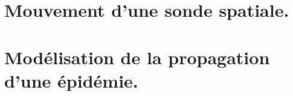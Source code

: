 


\section*{Mouvement d'une sonde spatiale.}

\newpage
\section*{Modélisation de la propagation d'une épidémie.}


